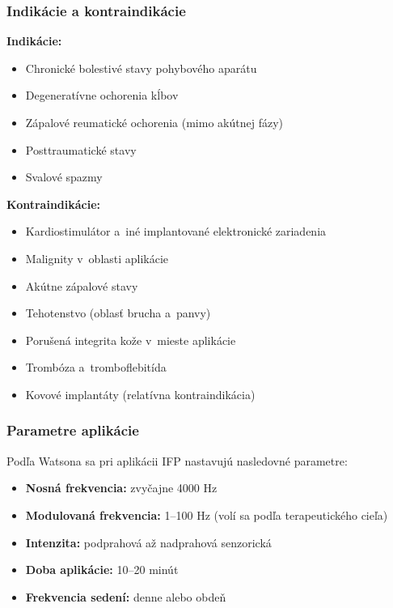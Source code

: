 \subsubsection{Indikácie a kontraindikácie}

\textbf{Indikácie:}
\begin{itemize}
    \item Chronické bolestivé stavy pohybového aparátu
    \item Degeneratívne ochorenia kĺbov
    \item Zápalové reumatické ochorenia (mimo akútnej fázy)
    \item Posttraumatické stavy
    \item Svalové spazmy \parencite{Podebradsky2009}
\end{itemize}

\textbf{Kontraindikácie:}
\begin{itemize}
    \item Kardiostimulátor a~iné implantované elektronické zariadenia
    \item Malignity v~oblasti aplikácie
    \item Akútne zápalové stavy
    \item Tehotenstvo (oblasť brucha a~panvy)
    \item Porušená integrita kože v~mieste aplikácie
    \item Trombóza a~tromboflebitída
    \item Kovové implantáty (relatívna kontraindikácia) \parencite{Navratil2019}
\end{itemize}

\subsubsection{Parametre aplikácie}

Podľa Watsona \parencite*{Watson2020} sa pri aplikácii IFP nastavujú nasledovné parametre:
\begin{itemize}
    \item \textbf{Nosná frekvencia:} zvyčajne 4000 Hz
    \item \textbf{Modulovaná frekvencia:} 1--100 Hz (volí sa podľa terapeutického cieľa)
    \item \textbf{Intenzita:} podprahová až nadprahová senzorická
    \item \textbf{Doba aplikácie:} 10--20 minút
    \item \textbf{Frekvencia sedení:} denne alebo obdeň
\end{itemize}

